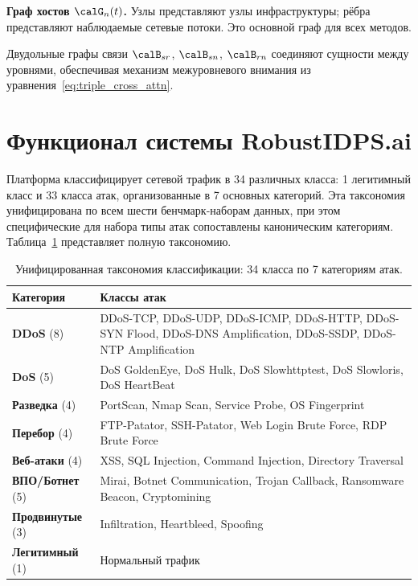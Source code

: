 \noindent\textbf{Граф хостов $\calG_n(t)$.} Узлы представляют узлы инфраструктуры; рёбра представляют наблюдаемые сетевые потоки. Это основной граф для всех методов.

\noindent Двудольные графы связи $\calB_{sr}$, $\calB_{sn}$, $\calB_{rn}$ соединяют сущности между уровнями, обеспечивая механизм межуровневого внимания из уравнения~\eqref{eq:triple_cross_attn}.


\section{Функционал системы RobustIDPS.ai}
\label{sec:taxonomy}

Платформа классифицирует сетевой трафик в 34 различных класса: 1 легитимный класс и 33 класса атак, организованные в 7 основных категорий. Эта таксономия унифицирована по всем шести бенчмарк-наборам данных, при этом специфические для набора типы атак сопоставлены каноническим категориям. Таблица~\ref{tab:taxonomy} представляет полную таксономию.

\begin{table}[htbp]
\centering
\caption{Унифицированная таксономия классификации: 34 класса по 7 категориям атак.}
\label{tab:taxonomy}
\small
\begin{tabular}{p{2.5cm} p{10.5cm}}
\toprule
\textbf{Категория} & \textbf{Классы атак} \\
\midrule
\textbf{DDoS} (8) & DDoS-TCP, DDoS-UDP, DDoS-ICMP, DDoS-HTTP, DDoS-SYN Flood, DDoS-DNS Amplification, DDoS-SSDP, DDoS-NTP Amplification \\
\addlinespace
\textbf{DoS} (5) & DoS GoldenEye, DoS Hulk, DoS Slowhttptest, DoS Slowloris, DoS HeartBeat \\
\addlinespace
\textbf{Разведка} (4) & PortScan, Nmap Scan, Service Probe, OS Fingerprint \\
\addlinespace
\textbf{Перебор} (4) & FTP-Patator, SSH-Patator, Web Login Brute Force, RDP Brute Force \\
\addlinespace
\textbf{Веб-атаки} (4) & XSS, SQL Injection, Command Injection, Directory Traversal \\
\addlinespace
\textbf{ВПО/Ботнет} (5) & Mirai, Botnet Communication, Trojan Callback, Ransomware Beacon, Cryptomining \\
\addlinespace
\textbf{Продвинутые} (3) & Infiltration, Heartbleed, Spoofing \\
\addlinespace
\textbf{Легитимный} (1) & Нормальный трафик \\
\bottomrule
\end{tabular}
\end{table}

